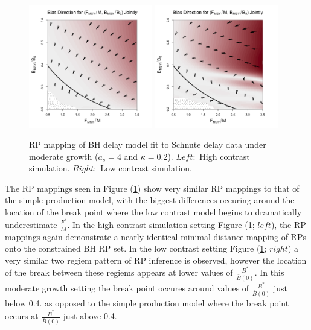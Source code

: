%
\begin{figure}[h!]
\includegraphics[width=0.48\textwidth]{../ddBias/directionalBiasDDSubExpT45N150A0-1AS4K0.2N38.png} %
\includegraphics[width=0.48\textwidth]{../ddBias/directionalBiasDDSubFlatT45N150A0-1AS4K0.2N56.png} %
\vspace{-0.75cm}
\caption{
RP mapping of BH delay model fit to Schnute delay data under moderate growth ($a_s=4$ and $\kappa=0.2$). 
$Left:$ High contrast simulation.
$Right:$ Low contrast simulation.
}\label{moderateGrowth}
\end{figure}

%
The RP mappings seen in Figure (\ref{moderateGrowth}) show very similar RP mappings 
to that of the simple production model, with the biggest differences occuring 
around the location of the break point where the low contrast model begins to 
dramatically underestimate $\frac{F^*}{M}$.
%
In the high contrast simulation setting Figure (\ref{moderateGrowth}; $left$), 
the RP mappings again demonstrate a nearly identical minimal distance mapping of 
RPs onto the constrained BH RP set. In the low contrast setting Figure (\ref{moderateGrowth}; $right$) 
a very similar two regiem pattern of RP inference is observed, however the 
location of the break between these regiems appears at lower values of 
$\frac{B^*}{\bar B(0)}$. In this moderate growth setting the break point 
occures around values of $\frac{B^*}{\bar B(0)}$ just below 0.4. as opposed 
to the simple production model where the break point occurs at $\frac{B^*}{\bar B(0)}$ 
just above 0.4. 


